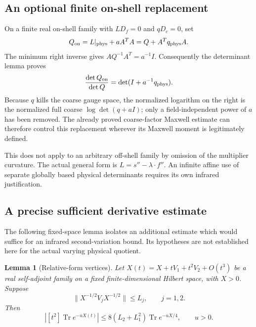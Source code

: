 \documentclass[11pt]{article}
\newtheorem{lemma}[theorem]{Lemma}
\theoremstyle{remark}
\begin{document}
\subsection{An optional finite on-shell replacement}
\label{pvs-onshell-section}

On a finite real on-shell family with
\(LD_f=0\) and \(qD_c=0\), set
\[
 Q_{\rm on}=L|_{\rm phys}+aA^TA=Q+A^Tq_{\rm phys}A.
\]
The minimum right inverse gives \(AQ^{-1}A^T=a^{-1}I\).
Consequently the determinant lemma proves
\begin{equation}
 \frac{\det Q_{\rm on}}{\det Q}
   =\det(I+a^{-1}q_{\rm phys}).
 \label{pvs-onshell-determinant}
\end{equation}
Because \(q\) kills the coarse gauge space, the normalized
logarithm on the right is the normalized full coarse
\(\log\det(q+aI)\); only a field-independent power of \(a\)
has been removed.
The already proved coarse-factor Maxwell estimate can therefore
control this replacement wherever its Maxwell moment is
legitimately defined.

This does not apply to an arbitrary off-shell family by omission
of the multiplier curvature.
The actual general form is
\(L=s''-\lambda\cdot f''\).
An infinite affine use of separate globally based physical
determinants requires its own infrared justification.

\subsection{A precise sufficient derivative estimate}
\label{pvs-vertex-section}

The following fixed-space lemma isolates an additional estimate
which would suffice for an infrared second-variation bound.
Its hypotheses are not established here for the actual varying
physical quotient.

\begin{lemma}[Relative-form vertices]
\label{pvs-vertex-lemma}
Let
\(X(t)=X+tV_1+t^2V_2+O(t^3)\)
be a real self-adjoint family on a fixed finite-dimensional
Hilbert space, with \(X>0\). Suppose
\begin{equation}
 \|X^{-1/2}V_jX^{-1/2}\|\le L_j,\qquad j=1,2.
 \label{pvs-vertex-hyp}
\end{equation}
Then
\begin{equation}
 \left|[t^2]\operatorname{Tr}e^{-uX(t)}\right|
 \le8(L_2+L_1^2)\operatorname{Tr}e^{-uX/4},
 \qquad u>0.
 \label{pvs-vertex-bound}
\end{equation}
\end{lemma}
\end{document}

